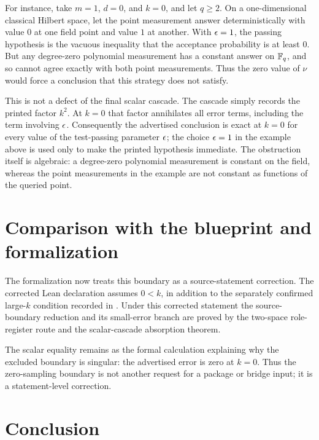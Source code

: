 \documentclass[11pt]{article}
\begin{document}
For instance, take \(m=1\), \(d=0\), and \(k=0\), and let \(q\ge 2\).  On a
one-dimensional classical Hilbert space, let the point measurement answer
deterministically with value \(0\) at one field point and value \(1\) at another.
With \(\epsilon=1\), the passing hypothesis is the vacuous inequality that the
acceptance probability is at least \(0\).  But any degree-zero polynomial
measurement has a constant answer on \(\mathbb{F}_q\), and so cannot agree exactly with
both point measurements.  Thus the zero value of \(\nu\) would force a
conclusion that this strategy does not satisfy.

This is not a defect of the final scalar cascade.  The cascade simply records
the printed factor \(k^2\).  At \(k=0\) that factor annihilates all error terms,
including the term involving \(\epsilon\).  Consequently the advertised conclusion
is exact at \(k=0\) for every value of the test-passing parameter \(\epsilon\); the
choice \(\epsilon=1\) in the example above is used only to make the printed
hypothesis immediate.  The obstruction itself is algebraic: a degree-zero
polynomial measurement is constant on the field, whereas the point measurements
in the example are not constant as functions of the queried point.

\section{Comparison with the blueprint and formalization}

The formalization now treats this boundary as a source-statement correction.
The corrected Lean declaration
 assumes \(0<k\), in
addition to the separately confirmed large-\(k\) condition recorded in
.  Under this corrected
statement the source-boundary reduction and its small-error branch are proved by
the two-space role-register route and the scalar-cascade absorption theorem.

The scalar equality  remains as the formal
calculation explaining why the excluded boundary is singular: the advertised
error is zero at \(k=0\).  Thus the zero-sampling boundary is not another
request for a package or bridge input; it is a statement-level correction.

\section{Conclusion}
\end{document}
